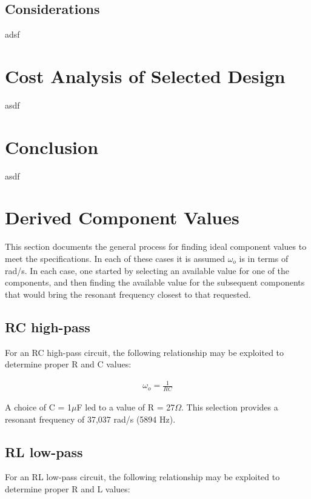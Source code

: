 \documentclass[journal]{IEEEtran}
\begin{document}
\subsection{Considerations}

adsf

\section{Cost Analysis of Selected Design}

asdf

\section{Conclusion}

asdf

\section{Derived Component Values}

This section documents the general process for finding ideal component values to meet the specifications. In each of these cases it is assumed $\omega_{o}$ is in terms of rad/s. In each case, one started by selecting an available value for one of the components, and then finding the available value for the subsequent components that would bring the resonant frequency closest to that requested.

\subsection{RC high-pass}

For an RC high-pass circuit, the following relationship may be exploited to determine proper R and C values:

\begin{align*}
\omega_{o} = \frac{1}{RC}
\end{align*}

A choice of C = 1$\mu$F led to a value of R = 27$\Omega$. This selection provides a resonant frequency of 37,037 rad/s (5894 Hz).

\subsection{RL low-pass}

For an RL low-pass circuit, the following relationship may be exploited to determine proper R and L values:
\end{document}
